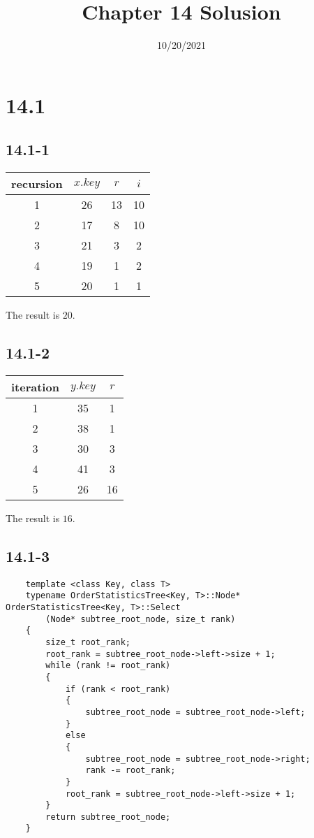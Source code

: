 

\title{Chapter 14 Solusion}
\date{10/20/2021}


\maketitle

\section*{14.1}

\subsection*{14.1-1}

\begin{tabular}{c|c|c|c}
    recursion & $x.key$ & $r$ & $i$\\
    \hline
    1 & 26 & 13 & 10 \\
    2 & 17 & 8 & 10 \\
    3 & 21 & 3 & 2 \\
    4 & 19 & 1 & 2 \\
    5 & 20 & 1 & 1
\end{tabular}

The result is $20$.

\subsection*{14.1-2}

\begin{tabular}{c|c|c}
    iteration & $y.key$ & $r$ \\
    \hline
    1 & 35 & 1 \\
    2 & 38 & 1 \\
    3 & 30 & 3 \\
    4 & 41 & 3 \\
    5 & 26 & 16
\end{tabular}

The result is $16$.

\subsection*{14.1-3}

\begin{verbatim}
    template <class Key, class T>
    typename OrderStatisticsTree<Key, T>::Node* OrderStatisticsTree<Key, T>::Select
        (Node* subtree_root_node, size_t rank)
    {
        size_t root_rank;
        root_rank = subtree_root_node->left->size + 1;
        while (rank != root_rank)
        {
            if (rank < root_rank) 
            {
                subtree_root_node = subtree_root_node->left;
            }
            else 
            {
                subtree_root_node = subtree_root_node->right;
                rank -= root_rank;
            }
            root_rank = subtree_root_node->left->size + 1;
        }
        return subtree_root_node;
    }
\end{verbatim}

